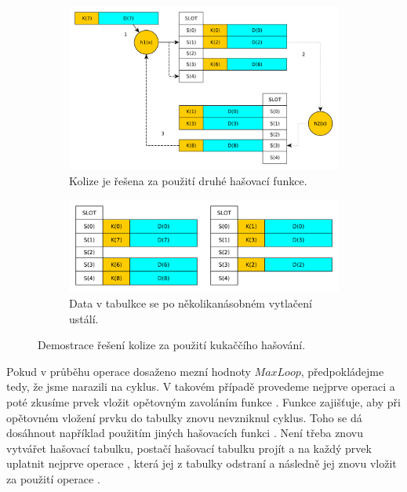 \begin{figure}[!ht]
	\centering
	\begin{subfigure}[b]{0.53\textwidth}
		\includegraphics[width=\textwidth]{fig/cuckoo_hashing_insert}
		\caption{Kolize je řešena za použití druhé hašovací funkce.}
	\end{subfigure}
	\begin{subfigure}[b]{0.46\textwidth}
		\includegraphics[width=\textwidth]{fig/cuckoo_hashing_insert_result}
		\caption{Data v tabulkce se po několikanásobném vytlačení ustálí.}
	\end{subfigure}
	\caption{Demostrace řešení kolize za použití kukaččího hašování.}
	\label{fig:cuckoo_hashing}
\end{figure}

Pokud v průběhu operace dosaženo mezní hodnoty $MaxLoop$, předpokládejme tedy, že jsme narazili na cyklus. V takovém případě 
provedeme nejprve operaci  a poté zkusíme prvek vložit opětovným zavoláním funkce .
Funkce  zajišťuje, aby při opětovném vložení prvku do tabulky znovu nevzniknul cyklus. Toho se dá
dosáhnout například použitím jiných hašovacích funkci \cite{Cuckoo_hashing}. Není třeba znovu vytvářet hašovací tabulku,
postačí hašovací tabulku projít a na každý prvek uplatnit nejprve operace , která jej z tabulky odstraní 
a následně jej znovu vložit za použití operace .


